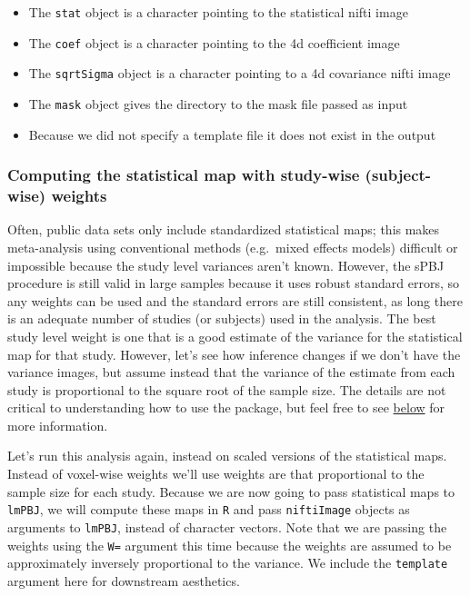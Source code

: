 \documentclass[]{article}
\providecommand{\tightlist}{%
  \setlength{\itemsep}{0pt}\setlength{\parskip}{0pt}}
\begin{document}
\begin{itemize}
\tightlist
\item
  The \texttt{stat} object is a character pointing to the statistical
  nifti image
\item
  The \texttt{coef} object is a character pointing to the 4d coefficient
  image
\item
  The \texttt{sqrtSigma} object is a character pointing to a 4d
  covariance nifti image
\item
  The \texttt{mask} object gives the directory to the mask file passed
  as input
\item
  Because we did not specify a template file it does not exist in the
  output
\end{itemize}

\hypertarget{computing-the-statistical-map-with-study-wise-subject-wise-weights}{%
\subsubsection{Computing the statistical map with study-wise
(subject-wise)
weights}\label{computing-the-statistical-map-with-study-wise-subject-wise-weights}}

Often, public data sets only include standardized statistical maps; this
makes meta-analysis using conventional methods (e.g.~mixed effects
models) difficult or impossible because the study level variances aren't
known. However, the sPBJ procedure is still valid in large samples
because it uses robust standard errors, so any weights can be used and
the standard errors are still consistent, as long there is an adequate
number of studies (or subjects) used in the analysis. The best study
level weight is one that is a good estimate of the variance for the
statistical map for that study. However, let's see how inference changes
if we don't have the variance images, but assume instead that the
variance of the estimate from each study is proportional to the square
root of the sample size. The details are not critical to understanding
how to use the package, but feel free to see
\protect\hyperlink{technical_details}{below} for more information.

Let's run this analysis again, instead on scaled versions of the
statistical maps. Instead of voxel-wise weights we'll use weights are
that proportional to the sample size for each study. Because we are now
going to pass statistical maps to \texttt{lmPBJ}, we will compute these
maps in \texttt{R} and pass \texttt{niftiImage} objects as arguments to
\texttt{lmPBJ}, instead of character vectors. Note that we are passing
the weights using the \texttt{W=} argument this time because the weights
are assumed to be approximately inversely proportional to the variance.
We include the \texttt{template} argument here for downstream
aesthetics.
\end{document}
